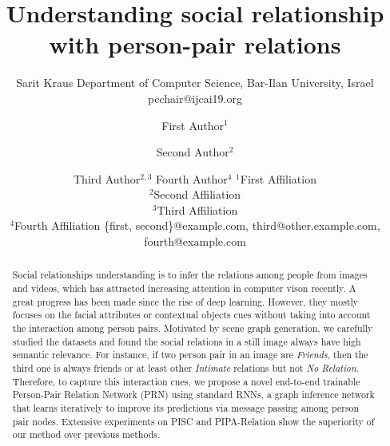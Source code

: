 \documentclass{article}
\title{Understanding social relationship with person-pair relations}
\author{
    Sarit Kraus
    \affiliations
    Department of Computer Science, Bar-Ilan University, Israel \emails
    pcchair@ijcai19.org
}
\author{
First Author$^1$
\and
Second Author$^2$\and
Third Author$^{2,3}$\And
Fourth Author$^4$
\affiliations
$^1$First Affiliation\\
$^2$Second Affiliation\\
$^3$Third Affiliation\\
$^4$Fourth Affiliation
\emails
\{first, second\}@example.com,
third@other.example.com,
fourth@example.com
}
\begin{document}
\maketitle

\begin{abstract}

Social relationships understanding is to infer the relations among people from images and videos, which has attracted increasing attention in computer vison recently. A great progress has been made since the rise of deep learning. However, they mostly focuses on the facial attributes or contextual objects cues without taking into account the interaction among person pairs. Motivated by scene graph generation, we carefully studied the datasets and found the social relations in a still image always have high semantic relevance. For instance, if two person pair in an image are {\it Friends}, then the third one is always friends or at least other {\it Intimate} relations but not {\it No Relation}. Therefore, to capture this interaction cues, we propose a novel end-to-end trainable Person-Pair Relation Network (PRN) using standard RNNs, a graph inference network that learns iteratively to improve its predictions via message passing among person pair nodes. Extensive experiments on PISC and PIPA-Relation show the superiority of our method over previous methods. 

\end{abstract}
\end{document}
